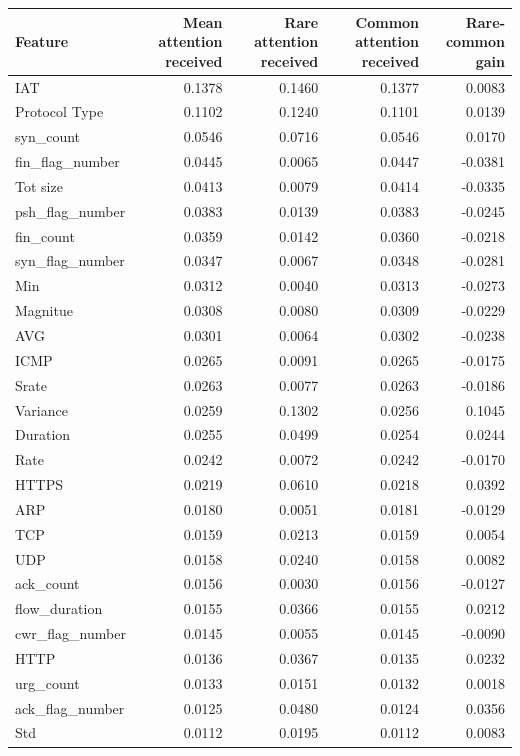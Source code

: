 \begin{tabular}{lrrrr}
\toprule
Feature & Mean attention received & Rare attention received & Common attention received & Rare-common gain \\
\midrule
IAT & 0.1378 & 0.1460 & 0.1377 & 0.0083 \\
Protocol Type & 0.1102 & 0.1240 & 0.1101 & 0.0139 \\
syn\_count & 0.0546 & 0.0716 & 0.0546 & 0.0170 \\
fin\_flag\_number & 0.0445 & 0.0065 & 0.0447 & -0.0381 \\
Tot size & 0.0413 & 0.0079 & 0.0414 & -0.0335 \\
psh\_flag\_number & 0.0383 & 0.0139 & 0.0383 & -0.0245 \\
fin\_count & 0.0359 & 0.0142 & 0.0360 & -0.0218 \\
syn\_flag\_number & 0.0347 & 0.0067 & 0.0348 & -0.0281 \\
Min & 0.0312 & 0.0040 & 0.0313 & -0.0273 \\
Magnitue & 0.0308 & 0.0080 & 0.0309 & -0.0229 \\
AVG & 0.0301 & 0.0064 & 0.0302 & -0.0238 \\
ICMP & 0.0265 & 0.0091 & 0.0265 & -0.0175 \\
Srate & 0.0263 & 0.0077 & 0.0263 & -0.0186 \\
Variance & 0.0259 & 0.1302 & 0.0256 & 0.1045 \\
Duration & 0.0255 & 0.0499 & 0.0254 & 0.0244 \\
Rate & 0.0242 & 0.0072 & 0.0242 & -0.0170 \\
HTTPS & 0.0219 & 0.0610 & 0.0218 & 0.0392 \\
ARP & 0.0180 & 0.0051 & 0.0181 & -0.0129 \\
TCP & 0.0159 & 0.0213 & 0.0159 & 0.0054 \\
UDP & 0.0158 & 0.0240 & 0.0158 & 0.0082 \\
ack\_count & 0.0156 & 0.0030 & 0.0156 & -0.0127 \\
flow\_duration & 0.0155 & 0.0366 & 0.0155 & 0.0212 \\
cwr\_flag\_number & 0.0145 & 0.0055 & 0.0145 & -0.0090 \\
HTTP & 0.0136 & 0.0367 & 0.0135 & 0.0232 \\
urg\_count & 0.0133 & 0.0151 & 0.0132 & 0.0018 \\
ack\_flag\_number & 0.0125 & 0.0480 & 0.0124 & 0.0356 \\
Std & 0.0112 & 0.0195 & 0.0112 & 0.0083 \\

\end{tabular}

